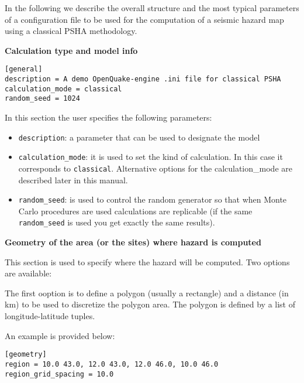 In the following we describe the overall structure and the most typical
parameters of a configuration file to be used for the computation of a
seismic hazard map using a classical PSHA methodology.


\textbf{Calculation type and model info}

\begin{verbatim}
[general]
description = A demo OpenQuake-engine .ini file for classical PSHA
calculation_mode = classical
random_seed = 1024
\end{verbatim}

In this section the user specifies the following parameters:

\begin{itemize}

    \item \texttt{description}: a parameter that can be used to designate
    the model

    \item \texttt{calculation\_mode}: it is used to set the kind of
    calculation. In this case it corresponds to \texttt{classical}.
    Alternative options for the calculation\_mode are described later in this
    manual.

    \item \texttt{random\_seed}: is used to control the random generator
    so that when Monte Carlo procedures are used calculations are
    replicable (if the same \texttt{random\_seed} is used you get exactly
    the same results).

\end{itemize}

\textbf{Geometry of the area (or the sites) where hazard is computed}

This section is used to specify where the hazard will be computed. Two
options are available:

The first ooption is to define a polygon (usually a rectangle) and a distance
(in km) to be used to discretize the  polygon area. The polygon is defined by
a list of longitude-latitude tuples.

An example is provided below:

\begin{verbatim}
[geometry]
region = 10.0 43.0, 12.0 43.0, 12.0 46.0, 10.0 46.0
region_grid_spacing = 10.0
\end{verbatim}

